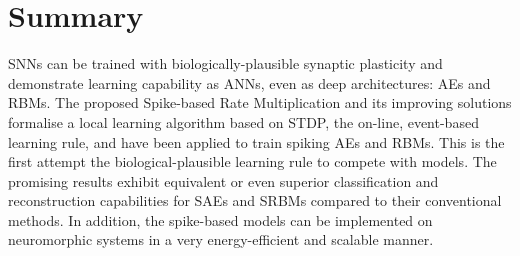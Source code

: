 \section{Summary}
SNNs can be trained with biologically-plausible synaptic plasticity and demonstrate \DIFdelbegin {}\DIFdelend learning capability as \DIFaddbegin {}\DIFaddend ANNs, even as deep architectures: AEs and RBMs.
The proposed Spike-based Rate Multiplication and its improving solutions formalise a local learning algorithm based on STDP, the on-line, event-based learning rule, and have been applied to train spiking AEs and RBMs.
This is the first attempt \DIFdelbegin {}\DIFdelend \DIFaddbegin {}\DIFaddend the biological-plausible learning rule to compete with \DIFdelbegin {}\DIFdelend \DIFaddbegin {}\DIFaddend models.
The promising results exhibit equivalent or even superior classification and reconstruction capabilities for SAEs and SRBMs compared to their conventional methods.
In addition, the spike-based models can be implemented on neuromorphic systems in a very energy-efficient and scalable manner.

